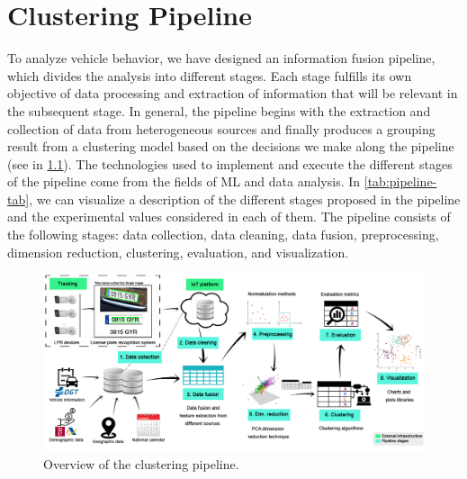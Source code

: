 \chapter{Clustering Pipeline} \label{ch:methodology}

To analyze vehicle behavior, we have designed an information fusion pipeline, which divides the analysis into different stages. Each stage fulfills its own objective of data processing and extraction of information that will be relevant in the subsequent stage. In general, the pipeline begins with the extraction and collection of data from heterogeneous sources and finally produces a grouping result from a clustering model based on the decisions we make along the pipeline (see in \cref{fig:arquitectura}). The technologies used to implement and execute the different stages of the pipeline come from the fields of ML and data analysis. In \cref{tab:pipeline-tab}, we can visualize a description of the different stages proposed in the pipeline and the experimental values considered in each of them. The pipeline consists of the following stages: data collection, data cleaning, data fusion, preprocessing, dimension reduction, clustering, evaluation, and visualization. 

\begin{figure}
\begin{center}
	\includegraphics[width = \linewidth]{Images/arquitectura.png}
\end{center}
	\caption{\label{fig:arquitectura} Overview of the clustering pipeline.}
\end{figure}

